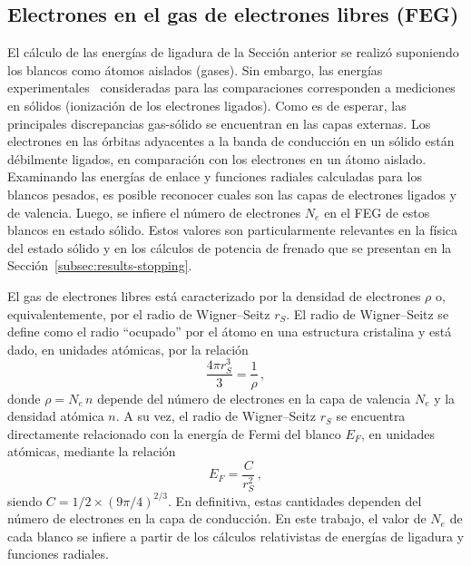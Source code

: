 \subsection{Electrones en el gas de electrones libres (FEG)}
\label{subsec:FEG}

El cálculo de las energías de ligadura de la Sección anterior se realizó 
suponiendo los blancos como átomos aislados (gases). Sin embargo, las 
energías experimentales~\cite{Williams:95} consideradas para las 
comparaciones corresponden a mediciones en sólidos (ionización de los 
electrones ligados). Como es de esperar, las principales discrepancias 
gas-sólido se encuentran en las capas externas. Los electrones en las 
órbitas adyacentes a la banda de conducción en un sólido están 
débilmente ligados, en comparación con los electrones en un átomo 
aislado. Examinando las energías de enlace y funciones radiales 
calculadas para los blancos pesados, es posible reconocer cuales son las 
capas de electrones 
ligados y de valencia. Luego, se infiere el número de electrones $N_e$ 
en el FEG de estos blancos en estado sólido. Estos valores son 
particularmente relevantes en la física del estado sólido y en los 
cálculos de potencia de frenado que se presentan en la 
Sección~\ref{subsec:results-stopping}.

El gas de electrones libres está caracterizado por la densidad de 
electrones $\rho$ o, equivalentemente, por el radio de Wigner--Seitz 
$r_S$. El radio de Wigner--Seitz se define como el radio ``ocupado'' por 
el átomo en una estructura cristalina y está dado, en unidades atómicas, 
por la relación
\begin{equation}
\frac{4\pi r_S^3}{3}=\frac{1}{\rho}\,,
\end{equation} 
donde $\rho=N_e \,n$ depende del número de electrones en la capa de 
valencia $N_e$ y la densidad atómica $n$. 
A su vez, el radio de Wigner--Seitz $r_S$ se encuentra directamente 
relacionado con la energía de Fermi del blanco $E_F$, en unidades 
atómicas, mediante la relación 
\begin{equation}
E_F=\frac{C}{r_S^2}\,,
\end{equation} 
siendo $C=1/2\times(9\pi/4)^{2/3}$. 
En definitiva, estas cantidades dependen del número de electrones en la 
capa de conducción. En este trabajo, el valor de $N_e$ de cada blanco se 
infiere a partir de los cálculos relativistas de energías de ligadura y 
funciones radiales.

